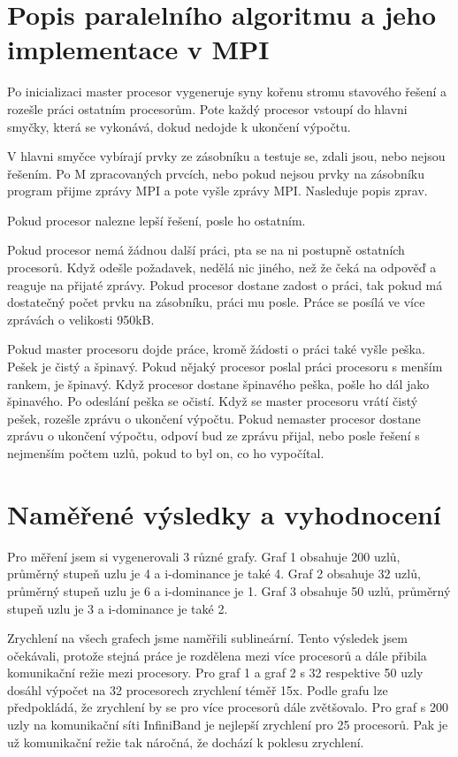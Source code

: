 \documentclass[12pt]{article}
\begin{document}
\section{Popis paralelního algoritmu a jeho implementace v MPI}

Po inicializaci master procesor vygeneruje syny kořenu stromu stavového řešení a rozešle práci ostatním procesorům. Pote každý procesor vstoupí do hlavni smyčky, která se vykonává, dokud nedojde k ukončení výpočtu.

V hlavni smyčce vybírají prvky ze zásobníku a testuje se, zdali jsou, nebo nejsou řešením. Po M zpracovaných prvcích, nebo pokud nejsou prvky na zásobníku program přijme zprávy MPI a pote vyšle zprávy MPI. Nasleduje popis zprav.

Pokud procesor nalezne lepší řešení, posle ho ostatním.

Pokud procesor nemá žádnou další práci, pta se na ni postupně ostatních procesorů. Když odešle požadavek, nedělá nic jiného, než že čeká na odpověď a reaguje na přijaté zprávy. Pokud procesor dostane zadost o práci, tak pokud má dostatečný počet prvku na zásobníku, práci mu posle. Práce se posílá ve více zprávách o velikosti 950kB.

Pokud master procesoru dojde práce, kromě žádosti o práci také vyšle peška. Pešek je čistý a špinavý. Pokud nějaký procesor poslal práci procesoru s menším rankem, je špinavý. Když procesor dostane špinavého peška, pošle ho dál jako špinavého. Po odeslání peška se očistí. Když se master procesoru vrátí čistý pešek, rozešle zprávu o ukončení výpočtu. Pokud nemaster procesor dostane zprávu o ukončení výpočtu, odpoví bud ze zprávu přijal, nebo posle řešení s nejmenším počtem uzlů, pokud to byl on, co ho vypočítal.

\section{Naměřené výsledky a vyhodnocení}
Pro měření jsem si vygenerovali 3 různé grafy. Graf 1 obsahuje 200 uzlů, průměrný stupeň uzlu je 4 a i-dominance je také 4. Graf 2 obsahuje 32 uzlů, průměrný stupeň uzlu je 6 a i-dominance je 1. Graf 3 obsahuje 50 uzlů, průměrný stupeň uzlu je 3 a i-dominance je také 2.

Zrychlení na všech grafech jsme naměřili sublineární. Tento výsledek jsem očekávali, protože stejná práce je rozdělena mezi více procesorů a dále přibila komunikační režie mezi procesory. Pro graf 1 a graf 2 s 32 respektive 50 uzly dosáhl výpočet na 32 procesorech zrychlení téměř 15x. Podle grafu lze předpokládá, že zrychlení by se pro více procesorů dále zvětšovalo. Pro graf s 200 uzly na komunikační síti InfiniBand je nejlepší zrychlení pro 25 procesorů. Pak je už komunikační režie tak náročná, že dochází k poklesu zrychlení.
\end{document}
